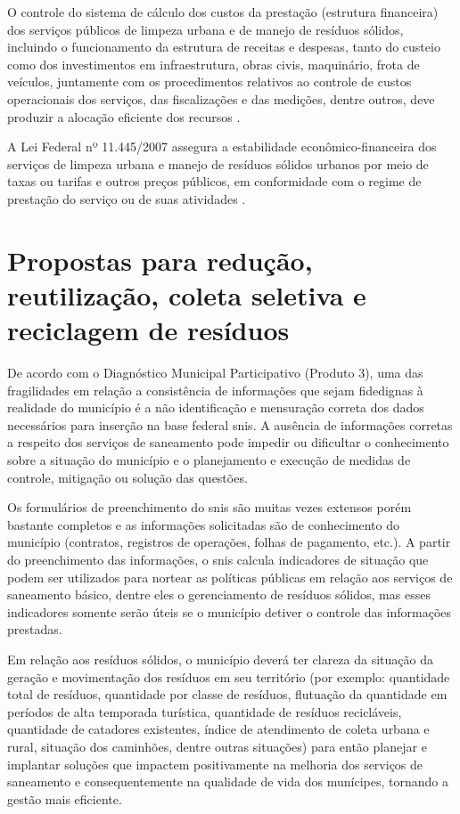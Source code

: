 O controle do sistema de cálculo dos custos da prestação (estrutura financeira) dos serviços públicos de limpeza urbana e de manejo de resíduos sólidos, incluindo o funcionamento da estrutura de receitas e despesas, tanto do custeio como dos investimentos em infraestrutura, obras civis, maquinário, frota de veículos, juntamente com os procedimentos relativos ao controle de custos operacionais dos serviços, das fiscalizações e das medições, dentre outros, deve produzir a alocação eficiente dos recursos \cite{agevap_manual_2019}.

A Lei Federal nº 11.445/2007 assegura a estabilidade econômico-financeira dos serviços de limpeza urbana e manejo de resíduos sólidos urbanos por meio de taxas ou tarifas e outros preços públicos, em conformidade com o regime de prestação do serviço ou de suas atividades \cite{agevap_manual_2019}.


\newpage
\FloatBarrier
\section{Propostas para redução, reutilização, coleta seletiva e reciclagem de resíduos}
\label{sec:metas}

De acordo com o Diagnóstico Municipal Participativo (Produto 3), uma das fragilidades em relação a consistência de informações que sejam fidedignas à realidade do município é a não identificação e mensuração correta dos dados necessários para inserção na base federal \gls{snis}. A ausência de informações corretas a respeito dos serviços de saneamento pode impedir ou dificultar o conhecimento sobre a situação do município e o planejamento e execução de medidas de controle, mitigação ou solução das questões.

Os formulários de preenchimento do \gls{snis} são muitas vezes extensos porém bastante completos e as informações solicitadas são de conhecimento do município (contratos, registros de operações, folhas de pagamento, etc.).	A partir do preenchimento das informações, o \gls{snis} calcula indicadores de situação que podem ser utilizados para nortear as políticas públicas em relação aos serviços de saneamento básico, dentre eles o gerenciamento de resíduos sólidos, mas esses indicadores somente serão úteis se o município detiver o controle das informações prestadas. 

Em relação aos resíduos sólidos, o município deverá ter clareza da situação da geração e movimentação dos resíduos em seu território (por exemplo: quantidade total de resíduos, quantidade por classe de resíduos, flutuação da quantidade em períodos de alta temporada turística, quantidade de resíduos recicláveis, quantidade de catadores existentes, índice de atendimento de coleta urbana e rural, situação dos caminhões, dentre outras situações) para então planejar e implantar soluções que impactem positivamente na melhoria dos serviços de saneamento e consequentemente na qualidade de vida dos munícipes, tornando a gestão mais eficiente.

